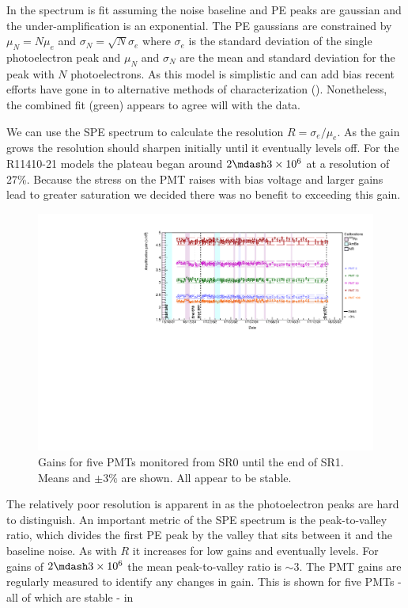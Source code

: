In  the spectrum is fit assuming the noise baseline and PE peaks are gaussian and the under-amplification is
an exponential.  The PE gaussians are constrained by $\mu_{N} = N \mu_{e}$ and $\sigma_{N} = \sqrt{N} \sigma_{e}$ where $\sigma_{e}$ is the
standard deviation of the single photoelectron peak and $\mu_{N}$ and $\sigma_{N}$ are the mean and standard deviation for the peak with
$N$ photoelectrons.  As this model is simplistic and can add bias recent efforts have gone in to alternative methods
of characterization ().  Nonetheless, the combined fit (green) appears to agree will with the data.

We can use the SPE spectrum to calculate the resolution $R = \sigma_{e} / \mu_{e}$.  As the gain grows the resolution should sharpen
initially until it eventually levels off.  For the R11410-21 models the plateau began around $2 \mdash 3 \times 10^{6}$ at a resolution of
27\%.  Because the stress on the PMT raises with bias voltage and larger gains lead to greater saturation we decided there was no benefit
to exceeding this gain.

\begin{figure}
\centering
\includegraphics[width=\textwidth]{PMTGainStability}
\caption{Gains for five PMTs monitored from SR0 until the end of SR1.  Means and $\pm 3\%$ are shown.  All appear to be stable.}
\label{fig:xenon1t_pmt_time}
\end{figure}

The relatively poor resolution is apparent in  as the photoelectron peaks are hard to distinguish.  An
important metric of the SPE spectrum is the peak-to-valley ratio, which divides the first PE peak by the valley that sits between it and
the baseline noise.  As with $R$ it increases for low gains and eventually levels.  For gains of $2 \mdash 3 \times 10^{6}$ the mean
peak-to-valley ratio is ${\sim} 3$.  The PMT gains are regularly measured to identify any changes in gain.  This is shown for five
PMTs - all of which are stable - in



